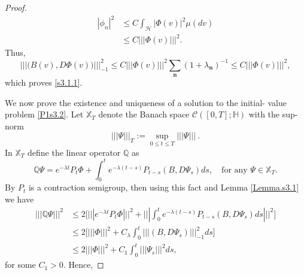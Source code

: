 \documentclass[review,onefignum,onetabnum]{siamart190516}
\begin{document}
\begin{proof}
        \begin{align*}
            | \phi_n |^2 
                & 
                \le C \int_{\mathcal{H}}\big|  \Phi(v)\big|^2  \mu(dv)
            \\
                &
                \le C |||\Phi(v) |||^2  .
        \end{align*}
        Thus,
        $$
            ||| 
                \big(B(v),D\Phi(v) \big) 
            |||_{-1}^2 
                \le 
                    C |||\Phi(v) |||^2
                    \sum_{\mathbf{n}} (1+\lambda_{\mathbf{n}})^{-1}  
                \le C |||\Phi(v) |||^2 ,
        $$
         which proves \eqref{s3.1.1}.
        
            We now prove the existence and uniqueness of a solution to the 
            initial- 
        value problem \eqref{P1s3.2}. Let $\mathbb{X}_T$ denote the
        Banach space $\mathcal{C}([0,T];\mathbb{H})$ with the sup-norm
         \begin{equation*}
              |||\Psi |||_T := \sup_{0\le t\le T} |||\Psi ||| \ .
         \end{equation*}
        In $\mathbb{X}_T$ define the linear operator $\mathbb{Q}$ as
        \begin{equation*}
            \mathbb{Q}\Psi =  e^{-\lambda t} P_t
            \Phi 
            + \int_0^t e^{-\lambda (t-s)}P_{t-s}(B,D\Psi_s) ds,
            \quad \text{for any } \Psi \in \mathbb{X}_T.
        \end{equation*}
        By  $P_t$ is a contraction semigroup, then using this
        fact and Lemma \ref{Lemma.s3.1} we have
        \begin{align*}
            ||| \mathbb{Q}\Psi|||^2 
                &\le 
                2 
                \Bigg[ 
                    ||| e^{-\lambda t}P_t\Phi|||^2 
                    +
                    |||
                        \int_0^t e^{-\lambda (t-s)} 
                        P_{t-s}(B,D\Psi_s) ds 
                    |||^2
                \Bigg]
                \\
                &\le 2
                \Big[ 
                    |||\Phi|||^2 
                    + C_\lambda 
                    \int_0^t |||(B,D\Psi_s) |||_{-1}^2 ds
                \Big] \\
                &\le 2 
                |||\Phi|||^2 
                + C_1 
                \int_0^t |||\Psi_s|||^2 ds,
        \end{align*}
        for some $C_1>0$. Hence,

\end{proof}
\end{document}
